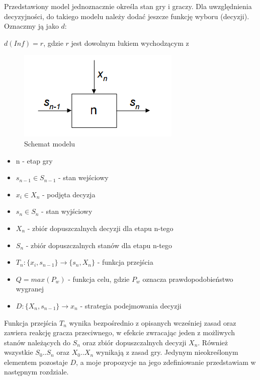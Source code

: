Przedstawiony model jednoznacznie określa stan gry i graczy. Dla uwzględnienia decyzyjności, do takiego modelu należy dodać jeszcze funkcję wyboru (decyzji). Oznaczmy ją jako $d$:
\begin{center}
	$d(Inf) = r$, gdzie $r$ jest dowolnym łukiem wychodzącym z
\end{center}
\clearpage
\begin{figure}[h]  %
	\centering
	\includegraphics[]{Resources/Schemat_Modelu.png}
	\caption{Schemat modelu} \label{fig:Schemat_Modelu}
\end{figure}
\begin{itemize}
	\item n - etap gry
	\item $s_{n-1} \in S_{n-1}$ - stan wejściowy
	\item $x_i \in X_n$ - podjęta decyzja
	\item $s_{n} \in S_n$ - stan wyjściowy
	\item $X_n$ - zbiór dopuszczalnych decyzji dla etapu n-tego
	\item $S_n$ - zbiór dopuszczalnych stanów dla etapu n-tego
	\item $T_n: \{x_i, s_{n-1} \} \rightarrow \{s_n, X_n\}$ - funkcja przejścia
	\item $Q = max(P_w)$ - funkcja celu, gdzie $P_w$ oznacza prawdopodobieństwo wygranej
	\item $D: \{X_n, s_{n-1}\} \rightarrow x_n$ - strategia podejmowania decyzji
\end{itemize}
Funkcja przejścia $T_n$ wynika bezpośrednio z opisanych wcześniej zasad oraz zawiera reakcję gracza przeciwnego, w efekcie zwracając jeden z możliwych stanów należących do $S_n$ oraz zbiór dopuszczalnych decyzji $X_n$. Również wszystkie $S_0 .. S_n$ oraz $X_0 .. X_n$ wynikają z zasad gry. Jedynym nieokreślonym elementem pozostaje $D$, a moje propozycje na jego zdefiniowanie przedstawiam w następnym rozdziale.